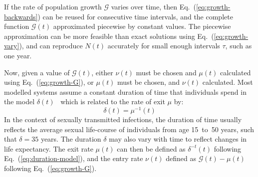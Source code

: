 If the rate of population growth $\mathcal{G}$ varies over time,
then Eq.~(\ref{eq:growth-backwards}) can be reused for consecutive time intervals,
and the complete function $\mathcal{G}(t)$ approximated piecewise by constant values.
The piecewise approximation can be more feasible
than exact solutions using Eq.~(\ref{eq:growth-vary}),
and can reproduce $N(t)$ accurately for small enough intervals $\tau$,
such as one year.
\par
Now, given a value of $\mathcal{G}(t)$,
either $\nu(t)$ must be chosen and $\mu(t)$ calculated using Eq.~(\ref{eq:growth-G}),
or $\mu(t)$ must be chosen, and $\nu(t)$ calculated.
Most modelled systems assume
a constant duration of time that individuals spend in the model $\delta(t)$~\citep{Anderson1991}
which is related to the rate of exit $\mu$ by:
\begin{equation} \label{eq:duration-model}
\delta(t) = \mu^{-1}(t)
\end{equation}
In the context of sexually transmitted infections, the duration of time usually reflects
the average sexual life-course of individuals from age 15~to~50 years,
such that $\delta = 35$ years.
The duration $\delta$ may also vary with time to reflect changes in life expectancy.
The exit rate $\mu(t)$ can then be defined as $\delta^{-t}(t)$
following Eq.~(\ref{eq:duration-model}),
and the entry rate $\nu(t)$ defined as $\mathcal{G}(t) - \mu(t)$
following Eq.~(\ref{eq:growth-G}).
